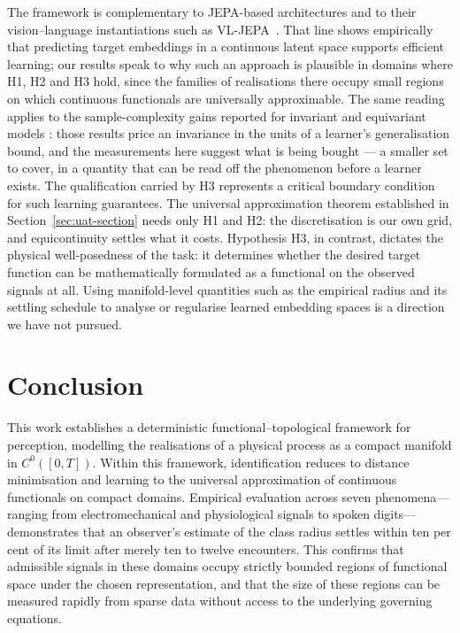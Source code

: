 \documentclass[10pt]{article}
\theoremstyle{plain}
\theoremstyle{definition}
\theoremstyle{remark}
\begin{document}
The framework is complementary to JEPA-based architectures
\citep{lecun2022path, assran2023self} and to their vision--language
instantiations such as VL-JEPA~\citep{chen2025vljepa}. That line shows
empirically that predicting target embeddings in a continuous latent space
supports efficient learning; our results speak to why such an approach is
plausible in domains where H1, H2 and H3 hold, since the families of
realisations there occupy small regions on which continuous functionals are
universally approximable. The same reading applies to the sample-complexity
gains reported for invariant and equivariant models
\citep{anselmi2016unsupervised, elesedy2021provably, tahmasebi2023exact}: those
results price an invariance in the units of a learner's generalisation bound,
and the measurements here suggest what is being bought --- a smaller set to
cover, in a quantity that can be read off the phenomenon before a learner
exists. The qualification carried by H3 represents a critical boundary condition for such
learning guarantees. The universal approximation theorem established in
Section~\ref{sec:uat-section} needs only H1 and H2: the discretisation is our own grid, and equicontinuity settles what it costs. Hypothesis H3, in contrast,
dictates the physical well-posedness of the task: it determines whether the
desired target function can be mathematically formulated as a functional on the
observed signals at all. Using manifold-level quantities such
as the empirical radius and its settling schedule to analyse or regularise learned embedding spaces is a direction we
have not pursued.

\section{Conclusion}
\label{sec:conclusion}

This work establishes a deterministic functional--topological framework for perception, modelling the realisations of a physical process as a compact manifold in $C^0([0,T])$. Within this framework, identification reduces to distance minimisation and learning to the universal approximation of continuous functionals on compact domains. Empirical evaluation across seven phenomena---ranging from electromechanical and physiological signals to spoken digits---demonstrates that an observer's estimate of the class radius settles within ten per cent of its limit after merely ten to twelve encounters. This confirms that admissible signals in these domains occupy strictly bounded regions of functional space under the chosen representation, and that the size of these regions can be measured rapidly from sparse data without access to the underlying governing equations.
\end{document}
